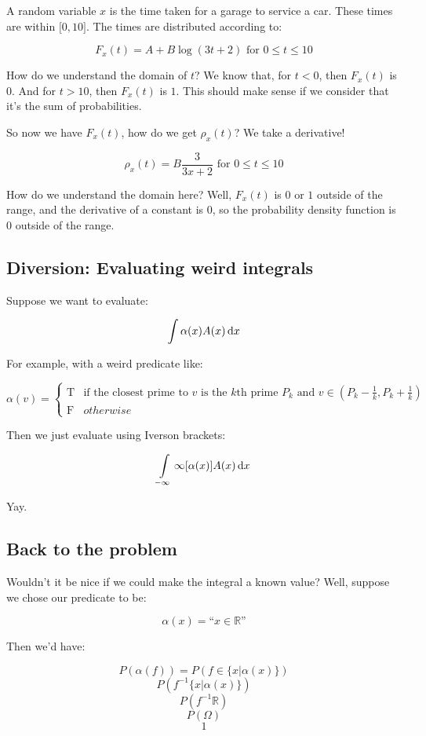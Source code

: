 \documentclass{article}
\newcommand{\inv}[1]{#1^{-1}}
\renewcommand{\d}[1]{\,\textnormal{d}#1}
\begin{document}
A random variable $x$ is the time taken for a garage to service a
car. These times are within $\lbrack 0,10\rbrack$. The times are
distributed according to:

\[
F_x(t)=A+B\log(3t+2)\text{ for }0\le t\le 10
\]

How do we understand the domain of $t$? We know that, for $t<0$, then
$F_x(t)$ is $0$. And for $t>10$, then $F_x(t)$ is $1$. This should
make sense if we consider that it's the sum of probabilities.

So now we have $F_x(t)$, how do we get $\rho_x(t)$? We take a derivative!

\[
\rho_x(t)=B\frac{3}{3x+2}\text{ for }0\le t\le 10
\]

How do we understand the domain here? Well, $F_x(t)$ is $0$ or $1$
outside of the range, and the derivative of a constant is $0$, so the
probability density function is $0$ outside of the range.

\subsection*{Diversion: Evaluating weird integrals}

Suppose we want to evaluate:

\[
\int\limits\alpha(x) A(x)\d{x}
\]

For example, with a weird predicate like:

\[
\alpha(v)=\begin{cases}\text{T} & \text{if the closest prime to $v$ is
  the $k$th prime $P_k$ and $v\in(P_k-\frac{1}{k},P_k+\frac{1}{k})$} \\
\text{F} & {otherwise}
\end{cases}
\]

Then we just evaluate using Iverson brackets:

\[
\int\limits_{-\infty}{\infty}\lbrack \alpha(x)\rbrack A(x)\d{x}
\]

Yay.

\subsection*{Back to the problem}

Wouldn't it be nice if we could make the integral a known value? Well,
suppose we chose our predicate to be:

\[
\alpha(x)=\text{``$x\in\mathbb{R}$''}
\]

Then we'd have:

\[
P(\alpha(f)) = P(f\in\{x|\alpha(x)\})
\] \[
P(\inv{f}\{x|\alpha(x)\})
\] \[
P(\inv{f}\mathbb{R})
\] \[
P(\Omega)
\] \[
1
\]
\end{document}
